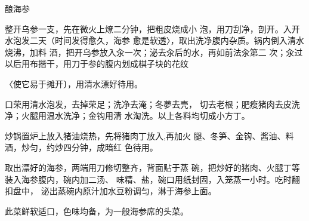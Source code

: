 \begin{recipe}[一品海参]{酿海参}

\ingredients


\cooking

\step 	整开乌参一支，先在微火上燎二分钟，把粗皮烧成小 泡，用刀刮净，剖开。入开水泡发二天（时间发得愈久，海参 愈是软透〉，取出洗净腹内杂质。锅内倒入清水烧沸，加料 酒，把开乌参放入汆一次；泌去汆后的水，再如前法汆第二 次；汆过以后用布揩干，用刀于参的腹内划成棋子块的花纹

〈使它易于摊开〕，用清水漂好待用。

\step 	口荣用清水泡发，去掉荣足；洗净去淹；冬夢去壳， 切去老根；肥瘦猪肉去皮洗净；火腿用温水洗净；金钩用清 水淘洗。以上各料均切成小方丁。

\step 	炒锅置炉上放入猪油烧热，先将猪肉丁放入,再加火 腿、冬笋、金钩、酱油、料酒，炒匀，约炒四分钟，成暗红 色待用。

取出漂好的海参，两端用刀修切整齐，背面贴于蒸 碗，把炒好的猪肉、火腿丁等装入海参腹内，碗内加二汤、 味精、盐，碗口用纸封固，入笼蒸一小时。吃时翻扣盘中， 泌出蒸碗内原汁加水豆粉调匀，淋于海参上面。

\notes

此菜鲜软适口，色味均备，为一般海参席的头菜。

\end{recipe}

